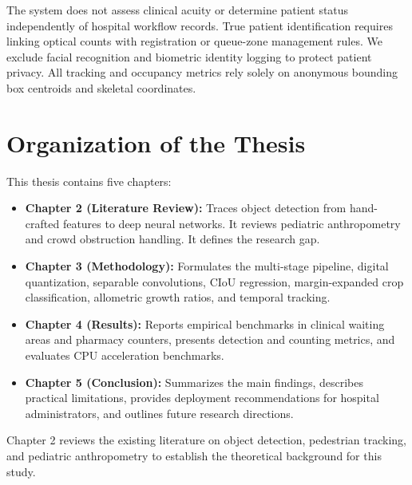 The system does not assess clinical acuity or determine patient status independently of hospital workflow records. True patient identification requires linking optical counts with registration or queue-zone management rules. We exclude facial recognition and biometric identity logging to protect patient privacy. All tracking and occupancy metrics rely solely on anonymous bounding box centroids and skeletal coordinates.

\section{Organization of the Thesis}
This thesis contains five chapters:
\begin{itemize}
    \item \textbf{Chapter 2 (Literature Review):} Traces object detection from hand-crafted features to deep neural networks. It reviews pediatric anthropometry and crowd obstruction handling. It defines the research gap.
    \item \textbf{Chapter 3 (Methodology):} Formulates the multi-stage pipeline, digital quantization, separable convolutions, CIoU regression, margin-expanded crop classification, allometric growth ratios, and temporal tracking.
    \item \textbf{Chapter 4 (Results):} Reports empirical benchmarks in clinical waiting areas and pharmacy counters, presents detection and counting metrics, and evaluates CPU acceleration benchmarks.
    \item \textbf{Chapter 5 (Conclusion):} Summarizes the main findings, describes practical limitations, provides deployment recommendations for hospital administrators, and outlines future research directions.
\end{itemize}

Chapter 2 reviews the existing literature on object detection, pedestrian tracking, and pediatric anthropometry to establish the theoretical background for this study.